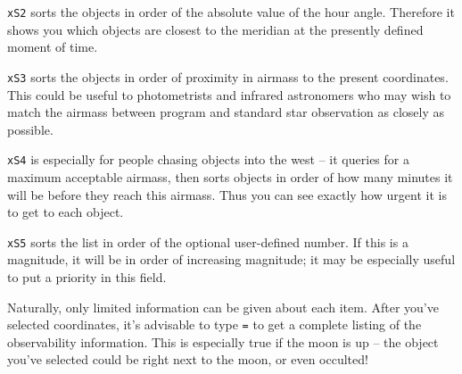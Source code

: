 \item{\tt xS2} sorts the objects in order of the absolute value of the
hour angle.  Therefore it shows you which objects are closest to the
meridian at the presently defined moment of time.

\item{\tt xS3} sorts the objects in order of proximity in airmass to the
present coordinates.  This could be useful to photometrists and
infrared astronomers who may wish to match the airmass between  
program and standard star observation as closely as possible.

\item{\tt xS4} is especially for people chasing objects into the
west -- it queries for a maximum acceptable airmass, then sorts objects
in order of how many minutes it will be before they reach this airmass.
Thus you can see exactly how urgent it is to get to each object.

\item{\tt xS5} sorts the list in order of the optional user-defined
number.  If this is a magnitude, it will be in order of increasing
magnitude; it may be especially useful to put a priority in this
field.  
  
Naturally, only limited information can be given about each item.
After you've selected coordinates, it's advisable to type {\tt =}
to get a complete listing of the observability information.  This is
especially true if the moon is up -- the object you've selected
could be right next to the moon, or even occulted!  



